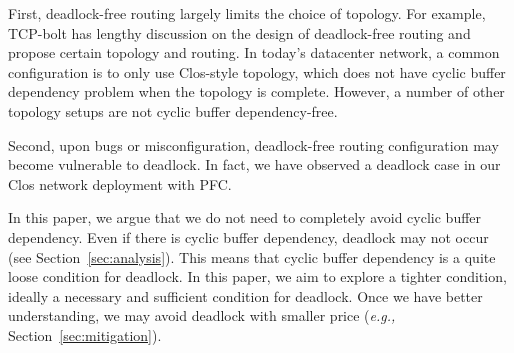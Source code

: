 First, deadlock-free routing largely limits the choice of topology. For example, TCP-bolt 
has lengthy discussion on the design of deadlock-free routing and propose certain topology and routing. 
In today's datacenter network, a common configuration is to only use Clos-style topology, which does 
not have cyclic buffer dependency problem when the topology is complete. However, a number
of other topology setups are not cyclic buffer dependency-free.

Second, upon bugs or misconfiguration, deadlock-free routing configuration may become
vulnerable to deadlock. In fact, we have observed a deadlock case in our Clos network
deployment with PFC. 


In this paper, we argue that we do not need to completely avoid cyclic buffer dependency.
Even if there is cyclic buffer dependency, deadlock may not occur (see Section~\ref{sec:analysis}).
This means that cyclic buffer dependency is a quite loose condition for deadlock.
In this paper, we aim to explore a tighter condition, ideally a necessary and sufficient condition for deadlock.
Once we have better understanding, we may avoid deadlock with smaller price ({\em e.g.,} 
Section~\ref{sec:mitigation}).


